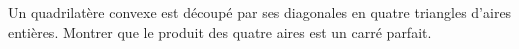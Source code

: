 Un quadrilatère convexe est découpé par ses diagonales en quatre triangles d'aires entières. Montrer que le produit des quatre aires est un carré parfait.
